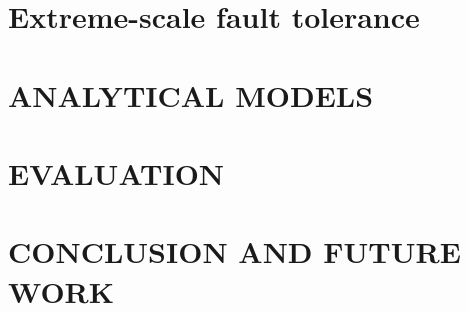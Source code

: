 \documentclass[a4paper]{isp}
\begin{document}
\section{Extreme-scale fault tolerance}
\label{frame_multiple}


%

%

\section{\uppercase{Analytical Models}}
\label{sec:analytical}


\section{\uppercase{Evaluation}}
\label{sec:evaluation}


\section{\uppercase{Conclusion and Future Work}}
\label{sec:conclusion}





\end{document}
